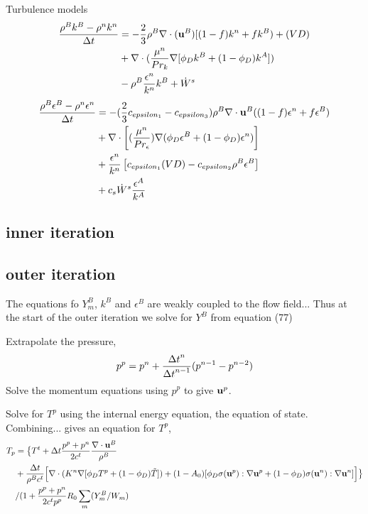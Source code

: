 \documentclass[10pt]{article}
\begin{document}
Turbulence models
\begin{align*}
  {\rho^B k^B - \rho^n k^n \over {\Delta t}} &= -{2\over3} \rho^B\nabla\cdot({\bf u}^B)[(1-f)k^n + f k^B) 
       + (VD)   \\
       & + \nabla\cdot( {\mu^n\over Pr_k} \nabla[ \phi_D k^B + (1-\phi_D) k^A] )  \\
       & - \rho^B {\epsilon^n\over k^n} k^B + \dot{W}^s
\end{align*}
\begin{align*}
  { \rho^B\epsilon^B -\rho^n\epsilon^n \over {\Delta t}} &=
        -( {2\over 3} c_{epsilon_1} -c_{epsilon_3} )\rho^B \nabla\cdot{\bf u}^B ( (1-f)\epsilon^n + f \epsilon^B) \\
      &   +\nabla\cdot \left[ ({\mu^n \over Pr_\epsilon }) \nabla ( \phi_D \epsilon^B+(1-\phi_D)\epsilon^n) \right] \\
      & + {\epsilon^n\over k^n}\left[ c_{epsilon_1}(VD) - c_{epsilon_2}\rho^B\epsilon^B \right] \\
      &  + c_s \dot{W}^s{\epsilon^A \over k^A}
\end{align*}


\subsection{inner iteration}


\subsection{outer iteration}

The equations fo $Y_m^B$, $k^B$ and $\epsilon^B$ are weakly coupled to the flow
field...
Thus at the start of the outer iteration we solve for $Y^B$ from equation (77)


Extrapolate the pressure,
\[
   p^p = p^n + {{\Delta t}^n\over {\Delta t}^{n-1}}( p^{n-1} - p^{n-2} )
\]
Solve the momentum equations using $p^p$ to give ${\bf u}^p$.

Solve for $T^p$ using the internal energy equation, the equation of state.
Combining... gives an equation for $T^p$,
\begin{align}
T_p &= \big\{ T^t + {\Delta t} {p^p+p^n\over 2 c^t} {\nabla\cdot{\bf u}^B \over \rho^B}  \label{eq:kiva:te} \\
    & + {{\Delta t}\over\rho^B c^t} \Big[\nabla\cdot( K^n \nabla[ \phi_D T^p + (1-\phi_D) \tilde{T} ] ) 
       + (1-A_0)[ \phi_D {\bf\sigma}({\bf u}^p):\nabla{\bf u}^p + (1-\phi_D) {\bf\sigma}({\bf u}^n):\nabla{\bf u}^n]  \Big] \big\} \\
 & / ( 1 + {p^p+p^n \over 2 c^t p^p } R_0 \sum_m ( Y_m^B/W_m )
\end{align}
\end{document}
